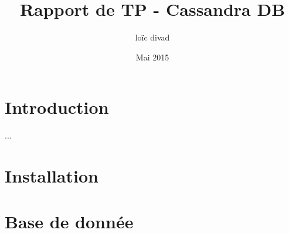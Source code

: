 \documentclass{article}
\title{Rapport de TP - Cassandra DB}
\author{loïc divad}
\date{Mai 2015}
\begin{document}
\maketitle

\section{Introduction}
...

\section{Installation}





\section{Base de donnée}


\end{document}
